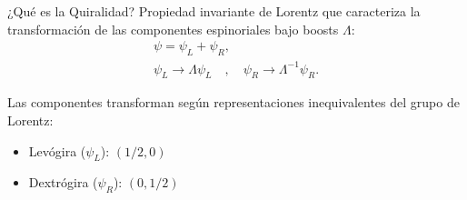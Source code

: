 \begin{block}{¿Qué es la Quiralidad?}
  Propiedad invariante de Lorentz que caracteriza la transformación de
  las componentes espinoriales bajo boosts $\Lambda$:
  \begin{gather}
    \psi = \psi_L + \psi_R, \\
    \psi_L \to \Lambda \psi_L \quad , \quad \psi_R \to \Lambda^{-1} \psi_R.
  \end{gather}

  Las componentes transforman según representaciones inequivalentes del
  grupo de Lorentz:
  \begin{itemize}
    \item Levógira ($\psi_L$): $(1/2, 0)$
    \item Dextrógira ($\psi_R$): $(0, 1/2)$
  \end{itemize}
\end{block}
